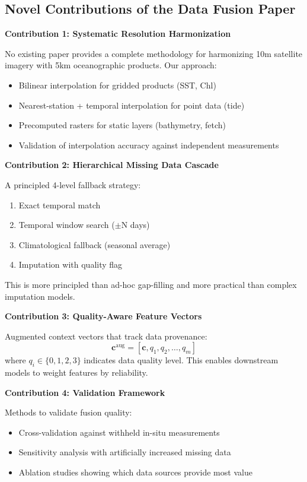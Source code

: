 \documentclass[11pt]{article}
\begin{document}
\subsection{Novel Contributions of the Data Fusion Paper}

\textbf{Contribution 1: Systematic Resolution Harmonization}

No existing paper provides a complete methodology for harmonizing 10m satellite imagery with 5km oceanographic products. Our approach:
\begin{itemize}
    \item Bilinear interpolation for gridded products (SST, Chl)
    \item Nearest-station + temporal interpolation for point data (tide)
    \item Precomputed rasters for static layers (bathymetry, fetch)
    \item Validation of interpolation accuracy against independent measurements
\end{itemize}

\textbf{Contribution 2: Hierarchical Missing Data Cascade}

A principled 4-level fallback strategy:
\begin{enumerate}
    \item Exact temporal match
    \item Temporal window search ($\pm$N days)
    \item Climatological fallback (seasonal average)
    \item Imputation with quality flag
\end{enumerate}

This is more principled than ad-hoc gap-filling and more practical than complex imputation models.

\textbf{Contribution 3: Quality-Aware Feature Vectors}

Augmented context vectors that track data provenance:
\[
\mathbf{c}^{\text{aug}} = [\mathbf{c}, q_1, q_2, \ldots, q_m]
\]
where $q_i \in \{0, 1, 2, 3\}$ indicates data quality level. This enables downstream models to weight features by reliability.

\textbf{Contribution 4: Validation Framework}

Methods to validate fusion quality:
\begin{itemize}
    \item Cross-validation against withheld in-situ measurements
    \item Sensitivity analysis with artificially increased missing data
    \item Ablation studies showing which data sources provide most value
\end{itemize}
\end{document}
